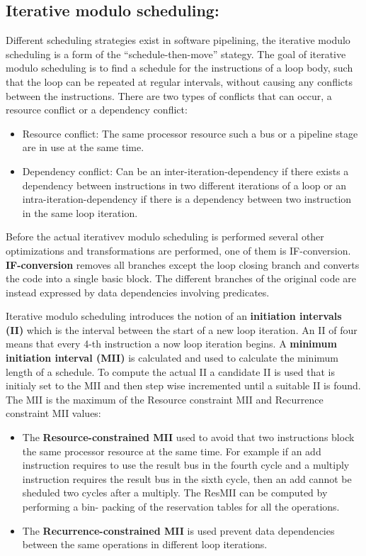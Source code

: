 \documentclass[a4paper,10pt]{article}
\begin{document}
\subsection{Iterative modulo scheduling:}
Different scheduling strategies exist in software pipelining, the iterative modulo scheduling is a form of the ``schedule-then-move''
stategy. The goal of iterative modulo scheduling is to find a schedule for the instructions of a loop body, such that the loop
can be repeated at regular intervals, without causing any conflicts between the instructions. There are two types of conflicts that can
occur, a resource conflict or a dependency conflict:
\begin{itemize}
 \item Resource conflict: The same processor resource such a bus or a pipeline stage are in use at the same time.
 \item Dependency conflict: Can be an inter-iteration-dependency if there exists a dependency between instructions in two different 
       iterations of a loop or an intra-iteration-dependency if there is a dependency between two instruction in the same loop iteration.
\end{itemize}
Before the actual iterativev modulo scheduling is performed several other optimizations and transformations are performed, one of them is
IF-conversion. \textbf{IF-conversion} removes all branches except the loop closing branch and converts the code into a single basic block. The different branches of the original code are instead expressed by data dependencies involving predicates.

Iterative modulo scheduling introduces the notion of an \textbf{initiation intervals (II)} which is the interval between the start of a 
new loop iteration. An II of four means that every 4-th instruction a now loop iteration begins. A \textbf{minimum initiation interval 
(MII)} is calculated and used to calculate the minimum length of a schedule. To compute the actual II a 
candidate II is used that is initialy set to the MII and then step wise incremented until a suitable II is found. The MII is the maximum 
of the Resource constraint MII and Recurrence constraint MII values:

\begin{itemize}
 \item The \textbf{Resource-constrained MII} used to avoid that two instructions block the same processor resource at the same time. For 
       example if an add instruction requires to use the result bus in the fourth cycle and a multiply instruction requires the result bus 
       in the sixth cycle, then an add cannot be sheduled two cycles after a multiply. The ResMII can be computed by performing a bin-
       packing of the reservation tables for all the operations.
 \item The \textbf{Recurrence-constrained MII} is used prevent data dependencies between the same operations in different loop iterations. 
\end{itemize}
\end{document}
